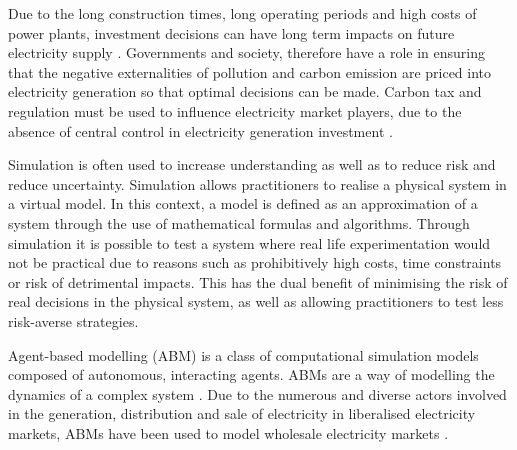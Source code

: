 
 Due to the long construction times, long operating periods and high costs of power plants, investment decisions can have long term impacts on future electricity supply \cite{Chappin2017}. Governments and society, therefore have a role in ensuring that the negative externalities of pollution and carbon emission are priced into electricity generation so that optimal decisions can be made. Carbon tax and regulation must be used to influence electricity market players, due to the absence of central control in electricity generation investment \cite{May2002}.

Simulation is often used to increase understanding as well as to reduce risk and reduce uncertainty. Simulation allows practitioners to realise a physical system in a virtual model. In this context, a model is defined as an approximation of a system through the use of mathematical formulas and algorithms. Through simulation it is possible to test a system where real life experimentation would not be practical due to reasons such as prohibitively high costs, time constraints or risk of detrimental impacts. This has the dual benefit of minimising the risk of real decisions in the physical system, as well as allowing practitioners to test less risk-averse strategies.

Agent-based modelling (ABM) is a class of computational simulation models composed of autonomous, interacting agents. ABMs are a way of modelling the dynamics of a complex system \cite{MacAl2010}. Due to the numerous and diverse actors involved in the generation, distribution and sale of electricity in liberalised electricity markets, ABMs have been used to model wholesale electricity markets \cite{Ringler2016a}.

